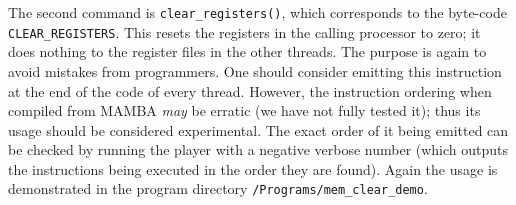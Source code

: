 The second command is \verb+clear_registers()+, which corresponds to the
byte-code \verb+CLEAR_REGISTERS+.
This resets the registers in the calling processor to zero; it does nothing
to the register files in the other threads.
The purpose is again to avoid mistakes from programmers. One should consider
emitting this instruction at the end of the code of every thread.
However, the instruction ordering when compiled from MAMBA {\em may} be
erratic (we have not fully tested it); thus its usage should be considered
experimental.
The exact order of it being emitted can be checked by running the player
with a negative verbose number (which outputs the instructions being executed
in the order they are found).
Again the usage is demonstrated in the program  directory \verb+/Programs/mem_clear_demo+.

